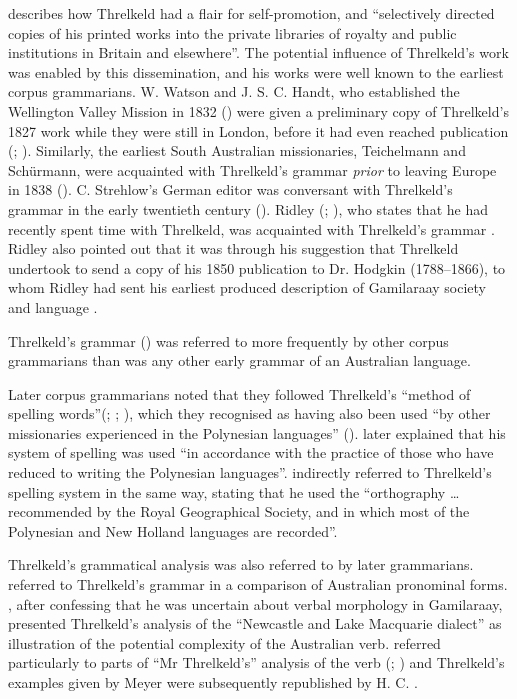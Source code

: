 \citet[169]{newton_more_1987} describes how Threlkeld had a flair for self-promotion, and “selectively directed copies of his printed works into the private libraries of royalty and public institutions in Britain and elsewhere”. The potential influence of Threlkeld’s work was enabled by this dissemination, and his works were well known to the earliest corpus grammarians. W. Watson and J. S. C. Handt, who established the Wellington Valley Mission in 1832 () were given a preliminary copy of Threlkeld’s 1827 work while they were still in London, before it had even reached publication (\citealt[410]{bridges_church_1978}; \citealt[12]{graetz_open_1988}). Similarly, the earliest South Australian missionaries, Teichelmann and Schürmann, were acquainted with Threlkeld’s grammar \textit{prior} to leaving Europe in 1838 (). C. Strehlow’s German editor was conversant with Threlkeld’s grammar in the early twentieth century (). Ridley (\citeyear[293]{ridley_gurre_1856}; ), who states that he had recently spent time with Threlkeld, was acquainted with Threlkeld’s grammar \citeyearpar{threlkeld_australian_1834}. Ridley also pointed out that it was through his suggestion that Threlkeld undertook to send a copy of his 1850 publication to Dr. Hodgkin (1788--1866), to whom Ridley had sent his earliest produced description of Gamilaraay society and language \citep{ridley_kamilaroi_1856}.

Threlkeld’s grammar (\citeyear{threlkeld_australian_1834}) was referred to more frequently by other corpus grammarians than was any other early grammar of an Australian language. 

Later corpus grammarians noted that they followed Threlkeld’s “method of spelling words”(\citealt[338]{gunther_lecture_1840}; \citealt[v]{teichelmann_outlines_1840}; \citealt[290]{ridley_kamilaroi_1856}), which they recognised as having also been used “by other missionaries experienced in the Polynesian languages” (\citealt[v]{teichelmann_outlines_1840}). \citet{ridley_kamilaroi_1866} later explained that his system of spelling was used ``in accordance with the practice of those who have reduced to writing the Polynesian languages''. \citet[vii]{moorhouse_vocabulary_1846} indirectly referred to Threlkeld’s spelling system in the same way, stating that he used the “orthography … recommended by the Royal Geographical Society, and in which most of the Polynesian and New Holland languages are recorded”. 

Threlkeld’s grammatical analysis was also referred to by later grammarians. \citet[vi]{moorhouse_vocabulary_1846} referred to Threlkeld’s grammar in a comparison of Australian pronominal forms. \citet[76]{ridley_kamilaroi_1855-1}, after confessing that he was uncertain about verbal morphology in Gamilaraay, presented Threlkeld’s analysis of the ``Newcastle and Lake Macquarie dialect'' as illustration of the potential complexity of the Australian verb. \citet[40--41]{meyer_vocabulary_1843} referred particularly to parts of “Mr Threlkeld’s” analysis of the verb (\citeyear[68, 127]{threlkeld_australian_1834}; ) and Threlkeld’s examples given by Meyer were subsequently republished by H. C. \citet[489]{gabelentz_uber_1861}.

